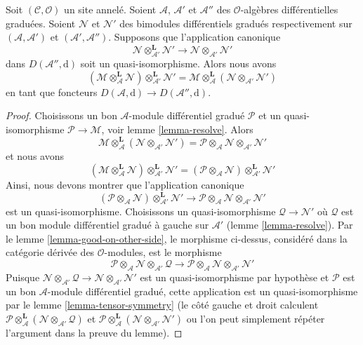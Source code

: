 \begin{lemma}
\label{lemma-compose-tensor} Soit
$(\mathcal{C}, \mathcal{O})$ un site annelé. Soient
$\mathcal{A}$, $\mathcal{A}'$ et $\mathcal{A}''$ des
$\mathcal{O}$-algèbres différentielles graduées. Soient $\mathcal{N}$ et $\mathcal{N}'$ des bimodules
différentiels gradués respectivement sur $(\mathcal{A}, \mathcal{A}')$
et $(\mathcal{A}', \mathcal{A}'')$. Supposons
que l'application canonique
$$
\mathcal{N} \otimes_{\mathcal{A}'}^\mathbf{L} \mathcal{N}'
\longrightarrow
\mathcal{N} \otimes_{\mathcal{A}'} \mathcal{N}'
$$
dans $D(\mathcal{A}'', \text{d})$ soit un quasi-isomorphisme.
Alors nous
avons $$
(\mathcal{M}
\otimes_\mathcal{A}^\mathbf{L} \mathcal{N})
\otimes_{\mathcal{A}'}^\mathbf{L} \mathcal{N}'
=
\mathcal{M}
\otimes_\mathcal{A}^\mathbf{L}
(\mathcal{N} \otimes_{\mathcal{A}'} \mathcal{N}')
$$ en
tant que foncteurs $D(\mathcal{A}, \text{d}) \to D(\mathcal{A}'', \text{d})$.
\end{lemma}

\begin{proof}
Choisissons un bon $\mathcal{A}$-module différentiel gradué
$\mathcal{P}$ et un quasi-isomorphisme $\mathcal{P} \to \mathcal{M}$, voir
lemme \ref{lemma-resolve}. Alors
$$
\mathcal{M}
\otimes_\mathcal{A}^\mathbf{L}
(\mathcal{N} \otimes_{\mathcal{A}'} \mathcal{N}') =
\mathcal{P} \otimes_\mathcal{A} \mathcal{N}
\otimes_{\mathcal{A}'} \mathcal{N}'
$$ et nous
avons
$$
(\mathcal{M}
\otimes_\mathcal{A}^\mathbf{L} \mathcal{N})
\otimes_{\mathcal{A}'}^\mathbf{L} \mathcal{N}' =
(\mathcal{P} \otimes_\mathcal{A} \mathcal{N})
\otimes_{\mathcal{A}'}^\mathbf{L} \mathcal{N}'
$$ Ainsi, nous
devons montrer que l'application canonique
$$
(\mathcal{P} \otimes_\mathcal{A} \mathcal{N})
\otimes_{\mathcal{A}'}^\mathbf{L} \mathcal{N}'
\longrightarrow
\mathcal{P} \otimes_\mathcal{A} \mathcal{N}
\otimes_{\mathcal{A}'} \mathcal{N}'
$$ est un
quasi-isomorphisme. Choisissons un quasi-isomorphisme
$\mathcal{Q} \to \mathcal{N}'$ où $\mathcal{Q}$ est un
bon module différentiel gradué à gauche sur $\mathcal{A}'$
(lemme \ref{lemma-resolve}). Par
le lemme \ref{lemma-good-on-other-side}, le
morphisme ci-dessus, considéré dans la catégorie dérivée des $\mathcal{O}$-modules,
est le morphisme $$
\mathcal{P} \otimes_\mathcal{A} \mathcal{N}
\otimes_{\mathcal{A}'} \mathcal{Q}
\longrightarrow
\mathcal{P} \otimes_\mathcal{A} \mathcal{N}
\otimes_{\mathcal{A}'} \mathcal{N}'
$$
Puisque $\mathcal{N} \otimes_{\mathcal{A}'} \mathcal{Q} \to
\mathcal{N} \otimes_{\mathcal{A}'} \mathcal{N}'$ est un quasi-isomorphisme
par hypothèse et $\mathcal{P}$ est un bon
$\mathcal{A}$-module différentiel gradué, cette application est un quasi-isomorphisme
par le lemme \ref{lemma-tensor-symmetry} (le côté gauche et
droit calculent $\mathcal{P} \otimes_\mathcal{A}^\mathbf{L} (\mathcal{N}
\otimes_{\mathcal{A}'} \mathcal{Q})$
et $\mathcal{P} \otimes_\mathcal{A}^\mathbf{L} (\mathcal{N}
\otimes_{\mathcal{A}'} \mathcal{N}')$ ou l'on peut simplement
répéter l'argument dans la preuve du lemme).
\end{proof}






